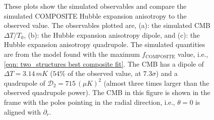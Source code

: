\documentclass[a4paper,12pt]{report}
\begin{document}
\begin{figure}[p]
\begin{subfigure}[b]{105mm}
        \caption{}
    \end{subfigure}
    \caption{These plots show the simulated observables and compare the simulated COMPOSITE Hubble expansion anisotropy to the observed value. The observables plotted are, (a): the simulated CMB $\Delta T / T_0$, (b): the Hubble expansion anisotropy dipole, and (c): the Hubble expansion anisotropy quadrupole. The simulated quantities are from the model found with the maximum $f_\text{COMPOSITE}$ value, i.e., \ref{eqn: two_structures best composite fit}. The CMB has a dipole of $\Delta T = 3.14\, \si{mK}$ ($54\%$ of the observed value, at $7.3 \sigma$) and a quadrupole of $\mathcal{D}_2 = 715\, (\mu \si{K})^2$ (almost three times larger than the observed quadrupole power). The CMB in this figure is shown in the frame with the poles pointing in the radial direction, i.e., $\theta=0$ is aligned with $\partial_r$.}
    \label{fig: two_structures COMP MCMC best fit observables}
\end{figure}
\FloatBarrier
\end{document}
